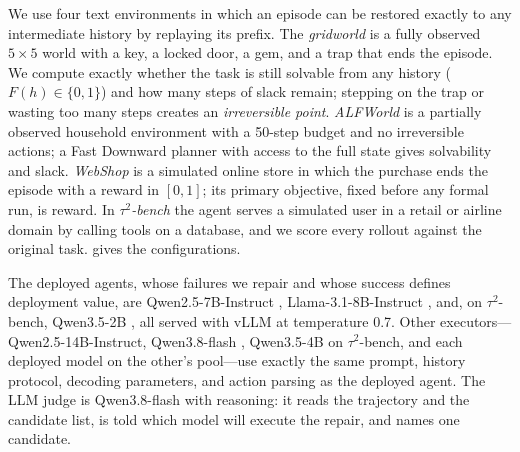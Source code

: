 \documentclass{article}
\newcommand{\tautwo}{$\tau^2$-bench}
\theoremstyle{plain}
\theoremstyle{definition}
\theoremstyle{remark}
\begin{document}
We use four text environments in which an episode can be restored exactly to any intermediate history by replaying its prefix. The \emph{gridworld} is a fully observed $5\times5$ world with a key, a locked door, a gem, and a trap that ends the episode. We compute exactly whether the task is still solvable from any history ($F(h)\in\{0,1\}$) and how many steps of slack remain; stepping on the trap or wasting too many steps creates an \emph{irreversible point}. \emph{ALFWorld} \citep{shridhar2021alfworld} is a partially observed household environment with a 50-step budget and no irreversible actions; a Fast Downward planner \citep{helmert2006fastdownward} with access to the full state gives solvability and slack. \emph{WebShop} \citep{yao2022webshop} is a simulated online store in which the purchase ends the episode with a reward in $[0,1]$; its primary objective, fixed before any formal run, is reward. In \emph{\tautwo{}} \citep{barres2025tau2} the agent serves a simulated user in a retail or airline domain by calling tools on a database, and we score every rollout against the original task.  gives the configurations.

The deployed agents, whose failures we repair and whose success defines deployment value, are Qwen2.5-7B-Instruct \citep{qwen2025qwen25}, Llama-3.1-8B-Instruct \citep{grattafiori2024llama3}, and, on \tautwo{}, Qwen3.5-2B \citep{qwen2026qwen35}, all served with vLLM \citep{kwon2023vllm} at temperature 0.7. Other executors---Qwen2.5-14B-Instruct, Qwen3.8-flash \citep{qwen2026flash}, Qwen3.5-4B on \tautwo{}, and each deployed model on the other's pool---use exactly the same prompt, history protocol, decoding parameters, and action parsing as the deployed agent. The LLM judge is Qwen3.8-flash with reasoning: it reads the trajectory and the candidate list, is told which model will execute the repair, and names one candidate.
\end{document}
